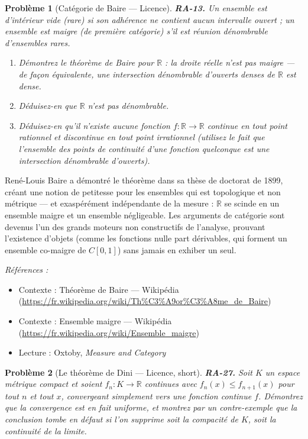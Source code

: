\documentclass[11pt]{article}
\newtheorem{problem}{Problème}
\newenvironment{refs}{\par\small\noindent\emph{Références :}\begin{itemize}\setlength\itemsep{0pt}}{\end{itemize}\normalsize}
\begin{document}
\bigskip

\begin{problem}[{Catégorie de Baire --- Licence}]
\textbf{RA-13.} Un ensemble est \textit{d'intérieur vide} (rare) si son adhérence ne contient
aucun intervalle ouvert ; un ensemble est \textit{maigre} (de première catégorie) s'il est réunion
dénombrable d'ensembles rares.
\begin{enumerate}
\item[(a)] Démontrez le théorème de Baire pour $ \mathbb{R} $ : la droite réelle n'est pas
maigre --- de façon équivalente, une intersection dénombrable d'ouverts denses de $ \mathbb{R} $ est
dense.
\item[(b)] Déduisez-en que $ \mathbb{R} $ n'est pas dénombrable.
\item[(c)] Déduisez-en qu'il n'existe aucune fonction
$ f : \mathbb{R} \to \mathbb{R} $ continue en tout point rationnel et discontinue en tout point
irrationnel (utilisez le fait que l'ensemble des points de continuité d'une fonction quelconque est
une intersection dénombrable d'ouverts).
\end{enumerate}

\end{problem}

\noindent René-Louis Baire a démontré le théorème dans sa thèse de doctorat de 1899,
créant une notion de \og{} petitesse \fg{} pour les ensembles qui est topologique et non métrique --- et
exaspérément indépendante de la mesure : $\mathbb{R}$ se scinde en un ensemble maigre et un ensemble
négligeable. Les arguments de catégorie sont devenus l'un des grands moteurs non constructifs de
l'analyse, prouvant l'existence d'objets (comme les fonctions nulle part dérivables, qui forment un
ensemble co-maigre de $ C[0,1] $) sans jamais en exhiber un seul.

\begin{refs}
\item Contexte : Théorème de Baire --- Wikipédia (\url{https://fr.wikipedia.org/wiki/Th%C3%A9or%C3%A8me_de_Baire})
\item Contexte : Ensemble maigre --- Wikipédia (\url{https://fr.wikipedia.org/wiki/Ensemble_maigre})
\item Lecture : Oxtoby, \textit{Measure and Category}
\end{refs}

\bigskip

\begin{problem}[{Le théorème de Dini --- Licence, short}]
\textbf{RA-27.} Soit $ K $ un espace métrique compact et soient
$ f_n : K \to \mathbb{R} $ continues avec $ f_n(x) \le f_{n+1}(x) $ pour tout $ n $ et tout
$ x $, convergeant simplement vers une fonction continue $ f $. Démontrez que la convergence est
en fait uniforme, et montrez par un contre-exemple que la conclusion tombe en défaut si l'on
supprime soit la compacité de $ K $, soit la continuité de la limite.
\end{problem}
\end{document}
